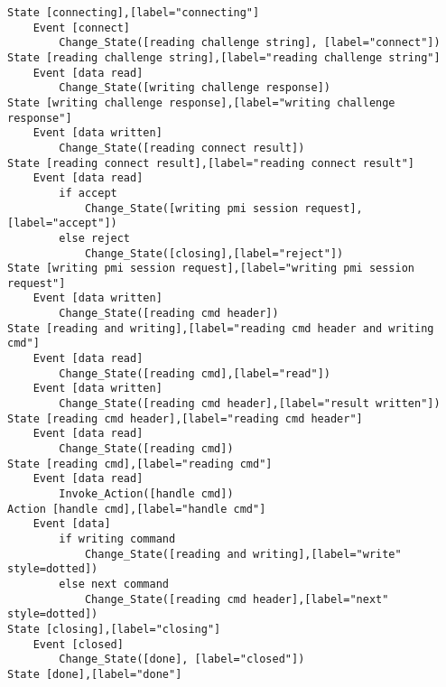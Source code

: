 \begin{comment}
This is the state machine for the pmi connect command.
Graph [pmi connect],
      [size="7.5, 10"]
\end{comment}
\begin{verbatim}
State [connecting],[label="connecting"]
	Event [connect]
		Change_State([reading challenge string], [label="connect"])
State [reading challenge string],[label="reading challenge string"]
	Event [data read]
		Change_State([writing challenge response])
State [writing challenge response],[label="writing challenge response"]
	Event [data written]
		Change_State([reading connect result])
State [reading connect result],[label="reading connect result"]
	Event [data read]
		if accept
			Change_State([writing pmi session request],[label="accept"])
		else reject
			Change_State([closing],[label="reject"])
State [writing pmi session request],[label="writing pmi session request"]
	Event [data written]
		Change_State([reading cmd header])
State [reading and writing],[label="reading cmd header and writing cmd"]
	Event [data read]
		Change_State([reading cmd],[label="read"])
	Event [data written]
		Change_State([reading cmd header],[label="result written"])
State [reading cmd header],[label="reading cmd header"]
	Event [data read]
		Change_State([reading cmd])
State [reading cmd],[label="reading cmd"]
	Event [data read]
		Invoke_Action([handle cmd])
Action [handle cmd],[label="handle cmd"]
	Event [data]
		if writing command
			Change_State([reading and writing],[label="write" style=dotted])
		else next command
			Change_State([reading cmd header],[label="next" style=dotted])
State [closing],[label="closing"]
	Event [closed]
		Change_State([done], [label="closed"])
State [done],[label="done"]
\end{verbatim}
